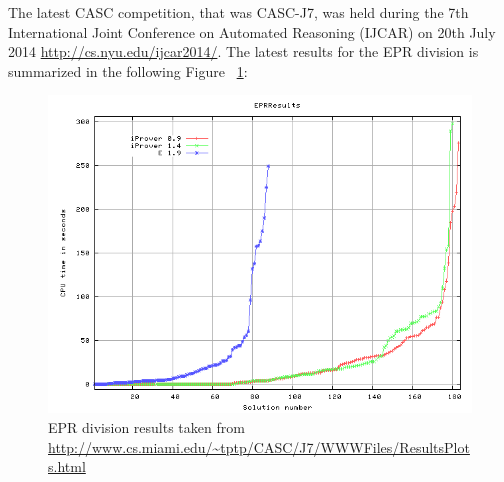The latest CASC competition, that was CASC-J7, was held during the 7th International Joint Conference on Automated Reasoning (IJCAR) on 20th July 2014 \url{http://cs.nyu.edu/ijcar2014/}. The latest results for the EPR division is summarized in the following Figure ~\ref{fig:epr_casc_results}:

	\begin{figure}[H]
		\centering
		\includegraphics[scale=0.5]{pictures/EPRResults-Proof-Time.png}
		\caption{EPR division results taken from \url{http://www.cs.miami.edu/~tptp/CASC/J7/WWWFiles/ResultsPlots.html} \label{fig:epr_casc_results}}
	\end{figure}


